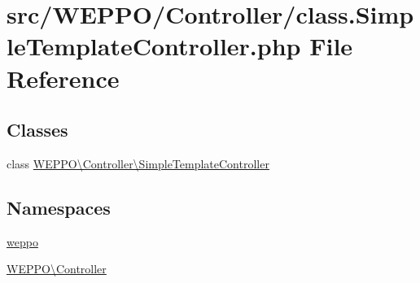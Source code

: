 \hypertarget{class_8SimpleTemplateController_8php}{}\section{src/\+W\+E\+P\+P\+O/\+Controller/class.Simple\+Template\+Controller.\+php File Reference}
\label{class_8SimpleTemplateController_8php}
\subsection*{Classes}
\begin{DoxyCompactItemize}
\item 
class \hyperlink{classWEPPO_1_1Controller_1_1SimpleTemplateController}{W\+E\+P\+P\+O\textbackslash{}\+Controller\textbackslash{}\+Simple\+Template\+Controller}
\end{DoxyCompactItemize}
\subsection*{Namespaces}
\begin{DoxyCompactItemize}
\item 
 \hyperlink{namespaceweppo}{weppo}
\item 
 \hyperlink{namespaceWEPPO_1_1Controller}{W\+E\+P\+P\+O\textbackslash{}\+Controller}
\end{DoxyCompactItemize}

